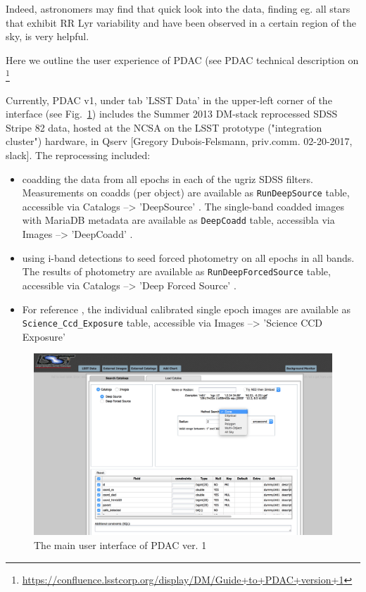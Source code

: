 \documentclass[fleqn,usenatbib]{mnras} %
\begin{document}
Indeed, astronomers may find that quick look into the data, finding eg. all stars that exhibit RR Lyr variability and have been observed in a certain region of the sky, is very helpful.  

Here we outline the user experience of PDAC (see PDAC technical description on \footnote{\url{https://confluence.lsstcorp.org/display/DM/Guide+to+PDAC+version+1}} 

Currently, PDAC v1, under tab 'LSST Data' in the upper-left corner of the interface (see Fig.~\ref{fig:PDAC_interface}) includes the Summer 2013 DM-stack reprocessed SDSS Stripe 82 data, hosted at the NCSA on the LSST prototype ("integration cluster") hardware, in Qserv [Gregory Dubois-Felsmann, priv.comm. 02-20-2017, slack].  The reprocessing included: 
\begin{itemize}
\item coadding the data from all epochs in each of the ugriz SDSS filters. Measurements on coadds (per object) are available as  \verb|RunDeepSource| table, accessible via Catalogs -->   'DeepSource' .  The single-band coadded images with MariaDB metadata are available as \verb|DeepCoadd| table, accessibla via Images -->  'DeepCoadd' . 
\item using i-band detections to seed forced photometry on all epochs in all bands. The results of photometry are available as \verb|RunDeepForcedSource| table, accessible via  Catalogs --> 'Deep Forced Source' .  
\item For reference , the individual calibrated single epoch images are available as \verb|Science_Ccd_Exposure| table, accessible via Images --> 'Science CCD Exposure'   
\end{itemize}


\begin{figure}
\includegraphics[width=\textwidth]{1_PDAC_interface}
\caption{The main user interface of PDAC ver. 1 }
\label{fig:PDAC_interface}
\end{figure}
\end{document}
